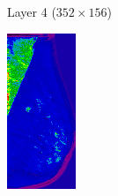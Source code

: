 \documentclass{beamer}
\begin{document}
\begin{frame}
\begin{figure}
\begin{subfigure}{0.19\textwidth}
		        \caption{Layer 4 ($352 \times 156$)}
            \end{subfigure}
	        \begin{subfigure}{0.19\textwidth}
		        \centering
			        \includegraphics[width=\textwidth]{plots/layer_7.png}

\end{subfigure}
\end{figure}
\end{frame}
\end{document}
